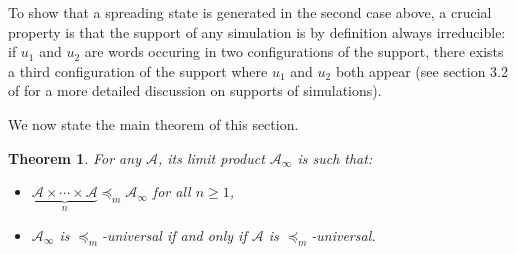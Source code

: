 \documentclass[a4paper]{elsarticle}
\newcommand{\ACA}{\mathcal{A}}
\newcommand{\simu}{\preccurlyeq}
\newcommand{\facsacsimu}{\simu_m}
\newcommand{\limprod}[1]{{\ACA}_\infty}
\newtheorem{thm}{Theorem}[section]
\begin{document}
To show that a spreading state is generated in the second case above,
a crucial property is that the support of any simulation is by
definition always irreducible: if $u_1$ and $u_2$ are words occuring
in two configurations of the support, there exists a third
configuration of the support where $u_1$ and $u_2$ both appear (see
section 3.2 of \cite{bulking1} for a more detailed discussion on
supports of simulations).

We now state the main theorem of this section.

\begin{thm}
  \label{thm:limprod}
  For any $\ACA$, its limit product $\limprod{\ACA}$ is such that:
  \begin{itemize}
  \item ${\underbrace{\ACA\times\cdots\times\ACA}_{n}\facsacsimu\limprod{\ACA}}$ for all ${n\geq 1}$,
  \item $\limprod{\ACA}$ is $\facsacsimu$-universal if and only if
    $\ACA$ is $\facsacsimu$-universal.
  \end{itemize}
\end{thm}
\end{document}

